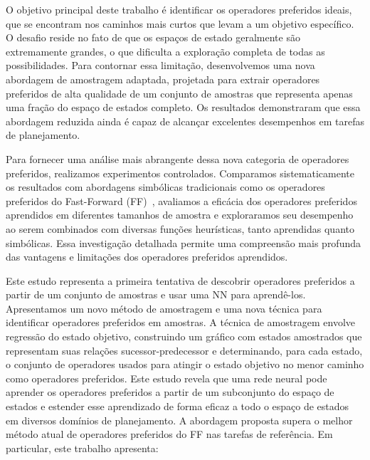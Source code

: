 \documentclass[ppgc,diss,english]{iiufrgs}
\begin{document}
O objetivo principal deste trabalho é identificar os operadores preferidos ideais, que se encontram nos caminhos mais curtos que levam a um objetivo específico. O desafio reside no fato de que os espaços de estado geralmente são extremamente grandes, o que dificulta a exploração completa de todas as possibilidades. Para contornar essa limitação, desenvolvemos uma nova abordagem de amostragem adaptada, projetada para extrair operadores preferidos de alta qualidade de um conjunto de amostras que representa apenas uma fração do espaço de estados completo. Os resultados demonstraram que essa abordagem reduzida ainda é capaz de alcançar excelentes desempenhos em tarefas de planejamento.


Para fornecer uma análise mais abrangente dessa nova categoria de operadores preferidos, realizamos experimentos controlados. Comparamos sistematicamente os resultados com abordagens simbólicas tradicionais como os operadores preferidos do Fast-Forward (FF)~\cite{Hoffmann.Nebel/2001, Helmert/2006}, avaliamos a eficácia dos operadores preferidos aprendidos em diferentes tamanhos de amostra e exploraramos seu desempenho ao serem combinados com diversas funções heurísticas, tanto aprendidas quanto simbólicas. Essa investigação detalhada permite uma compreensão mais profunda das vantagens e limitações dos operadores preferidos aprendidos.

Este estudo representa a primeira tentativa de descobrir operadores preferidos a partir de um conjunto de amostras e usar uma NN para aprendê-los. Apresentamos um novo método de amostragem e uma nova técnica para identificar operadores preferidos em amostras. A técnica de amostragem envolve regressão do estado objetivo, construindo um gráfico com estados amostrados que representam suas relações sucessor-predecessor e determinando, para cada estado, o conjunto de operadores usados para atingir o estado objetivo no menor caminho como operadores preferidos. Este estudo revela que uma rede neural pode aprender os operadores preferidos a partir de um subconjunto do espaço de estados e estender esse aprendizado de forma eficaz a todo o espaço de estados em diversos domínios de planejamento. A abordagem proposta supera o melhor método atual de operadores preferidos do FF nas tarefas de referência. Em particular, este trabalho apresenta:
\end{document}
